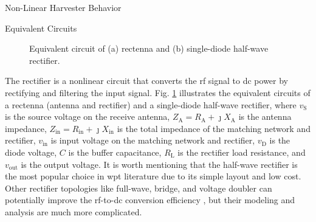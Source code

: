 \begin{section}{}
	\begin{subsection}{Non-Linear Harvester Behavior}
		\begin{subsubsection}{Equivalent Circuits}
			\begin{figure}[H]
				\centering
				\subfloat[Rectenna]{
					\resizebox{0.45\columnwidth}{!}{
						
					}
					\label{fg:rectenna}
				}
				\caption{
					Equivalent circuit of (a) rectenna and (b) single-diode half-wave rectifier.
				}
				\label{fg:harvester_circuit}
			\end{figure}
			The rectifier is a nonlinear circuit that converts the \gls{rf} signal to \gls{dc} power by rectifying and filtering the input signal.
			Fig. \ref{fg:harvester_circuit} illustrates the equivalent circuits of a rectenna (antenna and rectifier) and a single-diode half-wave rectifier, where $v_{\mathrm{S}}$ is the source voltage on the receive antenna, $Z_{\mathrm{A}} = R_{\mathrm{A}} + \jmath X_{\mathrm{A}}$ is the antenna impedance, $Z_{\mathrm{in}} = R_{\mathrm{in}} + \jmath X_{\mathrm{in}}$ is the total impedance of the matching network and rectifier, $v_{\mathrm{in}}$ is input voltage on the matching network and rectifier, $v_{\mathrm{D}}$ is the diode voltage, $C$ is the buffer capacitance, $R_{\mathrm{L}}$ is the rectifier load resistance, and $v_{\mathrm{out}}$ is the output voltage.
			It is worth mentioning that the half-wave rectifier is the most popular choice in \gls{wpt} literature due to its simple layout and low cost.
			Other rectifier topologies like full-wave, bridge, and voltage doubler can potentially improve the \gls{rf}-to-\gls{dc} conversion efficiency \cite{Rotenberg2020}, but their modeling and analysis are much more complicated.
		\end{subsubsection}


\end{subsection}
\end{section}
